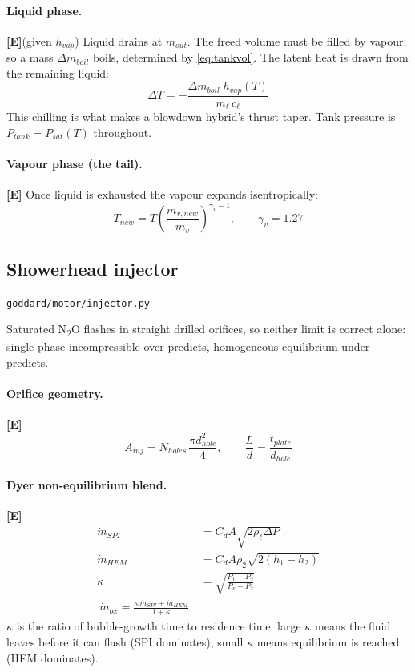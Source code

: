 \documentclass[11pt,a4paper]{article}
\newcommand{\established}{\textcolor{okgreen}{\textbf{[E]}}\xspace}
\newcommand{\src}[1]{\hfill{\footnotesize\texttt{#1}}}
\begin{document}
\paragraph{Liquid phase.} \established (given $h_{vap}$)
Liquid drains at $\dot m_{out}$. The freed volume must be filled by vapour, so
a mass $\Delta m_{boil}$ boils, determined by \eqref{eq:tankvol}. The latent
heat is drawn from the remaining liquid:
\begin{equation}
\Delta T = -\frac{\Delta m_{boil}\; h_{vap}(T)}{m_\ell\, c_\ell}
\end{equation}
This chilling is what makes a blowdown hybrid's thrust taper. Tank pressure is
$P_{tank} = P_{sat}(T)$ throughout.

\paragraph{Vapour phase (the tail).} \established
Once liquid is exhausted the vapour expands isentropically:
\begin{equation}
T_{new} = T \left(\frac{m_{v,new}}{m_v}\right)^{\gamma_v - 1},
\qquad \gamma_v = 1.27
\end{equation}

\subsection{Showerhead injector}
\label{sec:injector}
\src{goddard/motor/injector.py}

Saturated N\textsubscript{2}O flashes in straight drilled orifices, so neither
limit is correct alone: single-phase incompressible over-predicts, homogeneous
equilibrium under-predicts.

\paragraph{Orifice geometry.} \established
\begin{equation}
A_{inj} = N_{holes}\,\frac{\pi d_{hole}^2}{4}, \qquad
\frac{L}{d} = \frac{t_{plate}}{d_{hole}}
\end{equation}

\paragraph{Dyer non-equilibrium blend.} \established
\begin{align}
\dot m_{SPI} &= C_d A \sqrt{2\rho_\ell \Delta P} \\
\dot m_{HEM} &= C_d A \rho_2 \sqrt{2(h_1 - h_2)} \\
\kappa &= \sqrt{\frac{P_1 - P_2}{P_v - P_2}} \\
\boxed{\ \dot m_{ox} = \frac{\kappa\,\dot m_{SPI} + \dot m_{HEM}}{1 + \kappa}\ }
\end{align}
$\kappa$ is the ratio of bubble-growth time to residence time: large $\kappa$
means the fluid leaves before it can flash (SPI dominates), small $\kappa$ means
equilibrium is reached (HEM dominates).
\end{document}

